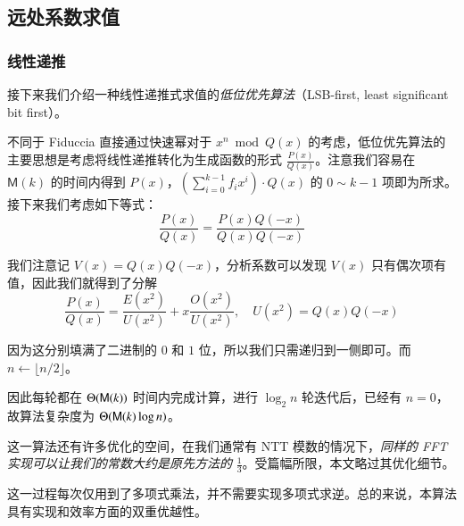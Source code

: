 \subsection{远处系数求值}

\subsubsection{线性递推}

接下来我们介绍一种线性递推式求值的\emph{低位优先算法}（LSB-first, least significant bit first）。

不同于 Fiduccia 直接通过快速幂对于 $x^n \bmod Q(x)$ 的考虑，低位优先算法的主要思想是考虑将线性递推转化为生成函数的形式 $\frac{P(x)}{Q(x)}$。注意我们容易在 $\mathsf M(k)$ 的时间内得到 $P(x)$，$\left(\sum_{i=0}^{k-1} f_i x^i\right) \cdot Q(x)$ 的 $0\sim k-1$ 项即为所求。接下来我们考虑如下等式：
$$
\frac {P(x)}{Q(x)} = \frac{P(x)Q(-x)}{Q(x)Q(-x)}
$$

我们注意记 $V(x)=Q(x)Q(-x)$，分析系数可以发现 $V(x)$ 只有偶次项有值，因此我们就得到了分解
$$
\frac{P(x)}{Q(x)} = \frac {E(x^2)}{U(x^2)} + x\frac {O(x^2)}{U(x^2)}, \quad U(x^2)=Q(x)Q(-x)
$$

因为这分别填满了二进制的 $0$ 和 $1$ 位，所以我们只需递归到一侧即可。而 $n \leftarrow \lfloor n/2 \rfloor$。

因此每轮都在 $\Theta(\mathsf M(k))$ 时间内完成计算，进行 $\log_2 n$ 轮迭代后，已经有 $n=0$，故算法复杂度为 $\Theta(\mathsf M(k)\log n)$。

这一算法还有许多优化的空间，在我们通常有 NTT 模数的情况下，\emph{同样的 FFT 实现可以让我们的常数大约是原先方法的} $\frac {1}{3}$。受篇幅所限，本文略过其优化细节。

这一过程每次仅用到了多项式乘法，并不需要实现多项式求逆。总的来说，本算法具有实现和效率方面的双重优越性。




